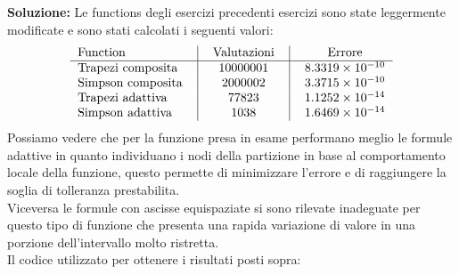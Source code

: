 \begin{flushleft}
\textbf{Soluzione:} Le functions degli esercizi precedenti esercizi sono state leggermente modificate e sono stati calcolati i seguenti valori:\\
\[
\begin{tabular}{l*{15}{c}}
	Function & \vline & Valutazioni & \vline & Errore \\
	\hline
	Trapezi composita & \vline & 10000001 & \vline & $8.3319 \times 10^{-10}$ \\
	Simpson composita & \vline & 2000002 & \vline & $3.3715 \times 10^{-10}$ \\
	Trapezi adattiva & \vline & 77823 & \vline & $1.1252 \times 10^{-14}$\\
	Simpson adattiva & \vline & 1038 & \vline & $1.6469 \times 10^{-14}$\\
\end{tabular}
\]
Possiamo vedere che per la funzione presa in esame performano meglio le formule adattive in quanto individuano i nodi della partizione in base al comportamento locale della funzione, questo permette di minimizzare l'errore e di raggiungere la soglia di tolleranza prestabilita.\\
Viceversa le formule con ascisse equispaziate si sono rilevate inadeguate per questo tipo di funzione che presenta una rapida variazione di valore in una porzione dell'intervallo molto ristretta.\\
Il codice utilizzato per ottenere i risultati posti sopra:

\end{flushleft}
